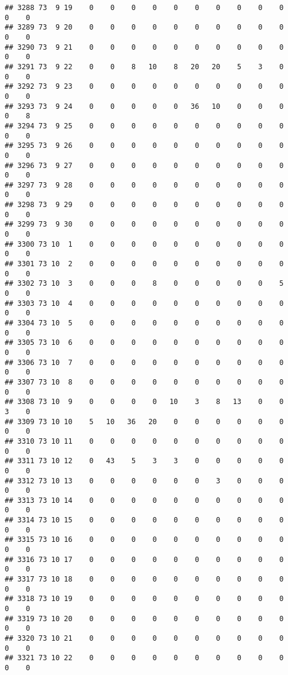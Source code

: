 \documentclass[]{article}
\begin{document}
\begin{verbatim}
## 3288 73  9 19    0    0    0    0    0    0    0    0    0    0    0    0
## 3289 73  9 20    0    0    0    0    0    0    0    0    0    0    0    0
## 3290 73  9 21    0    0    0    0    0    0    0    0    0    0    0    0
## 3291 73  9 22    0    0    8   10    8   20   20    5    3    0    0    0
## 3292 73  9 23    0    0    0    0    0    0    0    0    0    0    0    0
## 3293 73  9 24    0    0    0    0    0   36   10    0    0    0    0    8
## 3294 73  9 25    0    0    0    0    0    0    0    0    0    0    0    0
## 3295 73  9 26    0    0    0    0    0    0    0    0    0    0    0    0
## 3296 73  9 27    0    0    0    0    0    0    0    0    0    0    0    0
## 3297 73  9 28    0    0    0    0    0    0    0    0    0    0    0    0
## 3298 73  9 29    0    0    0    0    0    0    0    0    0    0    0    0
## 3299 73  9 30    0    0    0    0    0    0    0    0    0    0    0    0
## 3300 73 10  1    0    0    0    0    0    0    0    0    0    0    0    0
## 3301 73 10  2    0    0    0    0    0    0    0    0    0    0    0    0
## 3302 73 10  3    0    0    0    8    0    0    0    0    0    5    0    0
## 3303 73 10  4    0    0    0    0    0    0    0    0    0    0    0    0
## 3304 73 10  5    0    0    0    0    0    0    0    0    0    0    0    0
## 3305 73 10  6    0    0    0    0    0    0    0    0    0    0    0    0
## 3306 73 10  7    0    0    0    0    0    0    0    0    0    0    0    0
## 3307 73 10  8    0    0    0    0    0    0    0    0    0    0    0    0
## 3308 73 10  9    0    0    0    0   10    3    8   13    0    0    3    0
## 3309 73 10 10    5   10   36   20    0    0    0    0    0    0    0    0
## 3310 73 10 11    0    0    0    0    0    0    0    0    0    0    0    0
## 3311 73 10 12    0   43    5    3    3    0    0    0    0    0    0    0
## 3312 73 10 13    0    0    0    0    0    0    3    0    0    0    0    0
## 3313 73 10 14    0    0    0    0    0    0    0    0    0    0    0    0
## 3314 73 10 15    0    0    0    0    0    0    0    0    0    0    0    0
## 3315 73 10 16    0    0    0    0    0    0    0    0    0    0    0    0
## 3316 73 10 17    0    0    0    0    0    0    0    0    0    0    0    0
## 3317 73 10 18    0    0    0    0    0    0    0    0    0    0    0    0
## 3318 73 10 19    0    0    0    0    0    0    0    0    0    0    0    0
## 3319 73 10 20    0    0    0    0    0    0    0    0    0    0    0    0
## 3320 73 10 21    0    0    0    0    0    0    0    0    0    0    0    0
## 3321 73 10 22    0    0    0    0    0    0    0    0    0    0    0    0

\end{verbatim}
\end{document}
